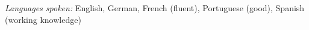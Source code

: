 \documentclass[10pt,letterpaper]{article}
\begin{document}
\begin{longtable}{lp{6.3in}}
%


\end{longtable}

\textit{Languages spoken:} English, German, French (fluent), Portuguese (good), Spanish (working knowledge)
\end{document}
